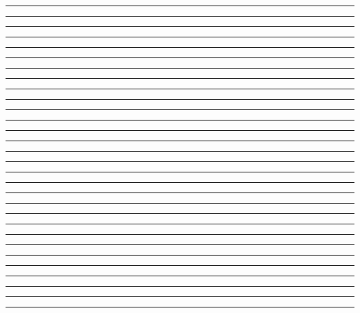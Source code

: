 \documentclass{article}
\begin{document}
\newpage
\noindent{}\rule{1cm}{0.025cm}\framebox{\rule{1cm}{1cm}}

\newpage
\noindent{}\rule{1cm}{0.025cm}

\newpage
\noindent{}\rule{1cm}{0.025cm}

\newpage
\noindent{}\rule{1cm}{0.025cm}

\newpage
\noindent{}\rule{1cm}{0.025cm}

\newpage
\noindent{}\rule{1cm}{0.025cm}

\newpage
\noindent{}\rule{1cm}{0.025cm}

\newpage
\noindent{}\rule{1cm}{0.025cm}

\newpage
\noindent{}\rule{1cm}{0.025cm}

\newpage
\noindent{}\rule{1cm}{0.025cm}

\newpage
\noindent{}\rule{1cm}{0.025cm}

\newpage
\noindent{}\rule{1cm}{0.025cm}

\newpage
\noindent{}\rule{1cm}{0.025cm}

\newpage
\noindent{}\rule{1cm}{0.025cm}

\newpage
\noindent{}\rule{1cm}{0.025cm}

\newpage
\noindent{}\rule{1cm}{0.025cm}

\newpage
\noindent{}\rule{1cm}{0.025cm}

\newpage
\noindent{}\rule{1cm}{0.025cm}

\newpage
\noindent{}\rule{1cm}{0.025cm}

\newpage
\noindent{}\rule{1cm}{0.025cm}

\newpage
\noindent{}\rule{1cm}{0.025cm}

\newpage
\noindent{}\rule{1cm}{0.025cm}

\newpage
\noindent{}\rule{1cm}{0.025cm}

\newpage
\noindent{}\rule{1cm}{0.025cm}

\newpage
\noindent{}\rule{1cm}{0.025cm}

\newpage
\noindent{}\rule{1cm}{0.025cm}

\newpage
\noindent{}\rule{1cm}{0.025cm}

\newpage
\noindent{}\rule{1cm}{0.025cm}

\newpage
\noindent{}\rule{1cm}{0.025cm}

\newpage
\noindent{}\rule{1cm}{0.025cm}
\end{document}
